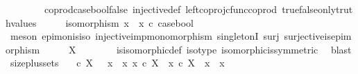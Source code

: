 \begin{isabellebody}
\ \ \ \ \ \ \ \ coprod{\isacharunderscore}{\kern0pt}case{\isacharunderscore}{\kern0pt}bool{\isacharunderscore}{\kern0pt}false\ injective{\isacharunderscore}{\kern0pt}def{}\ left{\isacharunderscore}{\kern0pt}coproj{\isacharunderscore}{\kern0pt}cfunc{\isacharunderscore}{\kern0pt}coprod\ true{\isacharunderscore}{\kern0pt}false{\isacharunderscore}{\kern0pt}only{\isacharunderscore}{\kern0pt}truth{\isacharunderscore}{\kern0pt}values{\isacharparenright}{\kern0pt}\isanewline
\ \ \isamarkupfalse%
\ \isamarkupfalse%
\ {\isachardoublequoteopen}isomorphism\ {\isacharparenleft}{\kern0pt}{\isacharparenleft}{\kern0pt}x{}\ {\isasymamalg}\ x{}{\isacharparenright}{\kern0pt}\ {\isasymcirc}\isactrlsub c\ case{\isacharunderscore}{\kern0pt}bool{\isacharparenright}{\kern0pt}{\isachardoublequoteclose}\isanewline
\ \ \ \ \isamarkupfalse%
\ {\isacharparenleft}{\kern0pt}meson\ epi{\isacharunderscore}{\kern0pt}mon{\isacharunderscore}{\kern0pt}is{\isacharunderscore}{\kern0pt}iso\ injective{\isacharunderscore}{\kern0pt}imp{\isacharunderscore}{\kern0pt}monomorphism\ singletonI\ surj\ surjective{\isacharunderscore}{\kern0pt}is{\isacharunderscore}{\kern0pt}epimorphism{\isacharparenright}{\kern0pt}\isanewline
\ \ \isamarkupfalse%
\ \isamarkupfalse%
\ {\isachardoublequoteopen}X\ {\isasymcong}\ {\isasymOmega}{\isachardoublequoteclose}\isanewline
\ \ \ \ \isamarkupfalse%
\ is{\isacharunderscore}{\kern0pt}isomorphic{\isacharunderscore}{\kern0pt}def\ iso{\isacharunderscore}{\kern0pt}type\ isomorphic{\isacharunderscore}{\kern0pt}is{\isacharunderscore}{\kern0pt}symmetric\ \isamarkupfalse%
\ blast\isanewline
{}\isamarkupfalse%
%
\endisatagproof
{\isafoldproof}%
%
\isadelimproof
\isanewline
%
\endisadelimproof
\isanewline
{}\isamarkupfalse%
\ size{\isacharunderscore}{\kern0pt}{}plus{\isacharunderscore}{\kern0pt}sets{\isacharcolon}{\kern0pt}\isanewline
\ \ {\isachardoublequoteopen}{\isacharparenleft}{\kern0pt}{\isasymOmega}\ {\isasymle}\isactrlsub c\ X{\isacharparenright}{\kern0pt}\ {\isacharequal}{\kern0pt}\ {\isacharparenleft}{\kern0pt}{\isasymexists}\ x{}{\isachardot}{\kern0pt}\ {\isasymexists}\ x{}{\isachardot}{\kern0pt}\ x{}\ {\isasymin}\isactrlsub c\ X\ {\isasymand}\ x{}\ {\isasymin}\isactrlsub c\ X\ {\isasymand}\ x{}\ {\isasymnoteq}\ x{}{\isacharparenright}{\kern0pt}{\isachardoublequoteclose}\isanewline
%
\isadelimproof
%
\endisadelimproof

\end{isabellebody}
